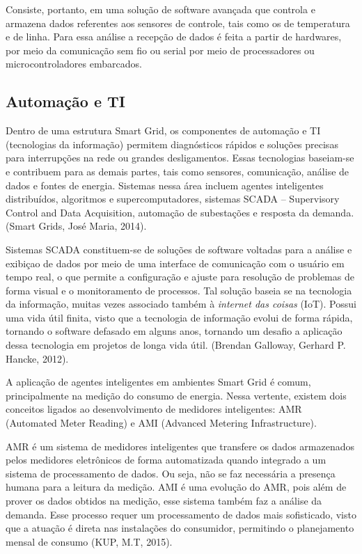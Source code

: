 Consiste, portanto, em uma solução de software avançada que controla e armazena dados referentes aos sensores de controle, tais como os de temperatura e de linha. Para essa análise a recepção de dados é feita a partir de hardwares, por meio da comunicação sem fio ou serial por meio de processadores ou microcontroladores embarcados.


\subsection{Automação e TI}
Dentro de uma estrutura Smart Grid, os componentes de automação e TI (tecnologias da informação) permitem diagnósticos rápidos e soluções precisas para interrupções na rede ou grandes desligamentos. Essas tecnologias baseiam-se e contribuem para as demais partes, tais como sensores, comunicação, análise de dados e fontes de energia. Sistemas nessa área incluem agentes inteligentes distribuídos, algoritmos e supercomputadores, sistemas SCADA – Supervisory Control and Data Acquisition, automação de subestações e resposta da demanda. (Smart Grids, José Maria, 2014).

Sistemas SCADA constituem-se de soluções de software voltadas para a análise e exibiçao de dados por meio de uma interface de comunicação com o usuário em tempo real, o que permite a configuração e ajuste para resolução de problemas de forma visual e o monitoramento de processos. Tal solução baseia se na tecnologia da informação, muitas vezes associado também à \textit{internet das coisas} (IoT). Possui uma vida útil finita, visto que a tecnologia de informação evolui de forma rápida, tornando o software defasado em alguns anos, tornando um desafio a aplicação dessa tecnologia em projetos de longa vida útil. (Brendan Galloway, Gerhard P. Hancke, 2012).

A aplicação de agentes inteligentes em ambientes Smart Grid é comum, principalmente na medição do consumo de energia. Nessa vertente, existem dois conceitos ligados ao desenvolvimento de medidores inteligentes: AMR (Automated Meter Reading) e AMI (Advanced Metering Infrastructure).

AMR é um sistema de medidores inteligentes que transfere os dados armazenados pelos medidores eletrônicos de forma automatizada quando integrado a um sistema de processamento de dados. Ou seja, não se faz necessária a presença humana para a leitura da medição. AMI é uma evolução do AMR, pois além de prover os dados obtidos na medição, esse sistema também faz a análise da demanda. Esse processo requer um processamento de dados mais sofisticado, visto que a atuação é direta nas instalações do consumidor, permitindo o planejamento mensal de consumo (KUP, M.T, 2015).


